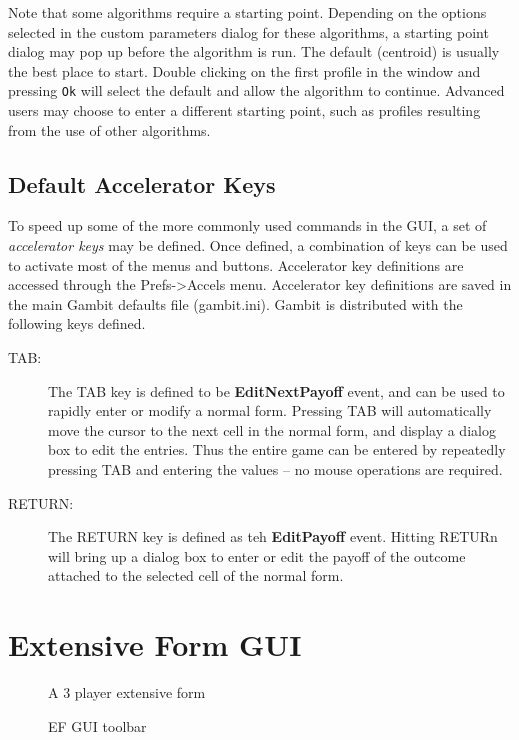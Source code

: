\documentclass[12pt]{report}
\begin{document}
Note that some algorithms require a starting point.  Depending on the
options selected in the custom parameters dialog for these algorithms,
a starting point dialog may pop up before the algorithm is run.  The
default (centroid) is usually the best place to start.  Double
clicking on the first profile in the window and pressing {\tt Ok} will
select the default and allow the algorithm to continue. Advanced users
may choose to enter a different starting point, such as profiles
resulting from the use of other algorithms.

\section{Default Accelerator Keys}\label{NormFormDefAccl}
To speed up some of the more commonly used commands in the GUI, a set of 
{\em accelerator keys} may be defined.  Once defined, a combination of keys
can be used to activate most of the menus and buttons.  Accelerator key
definitions are accessed through the Prefs->Accels menu.  Accelerator key
definitions are saved in the main Gambit defaults file (gambit.ini).  Gambit
is distributed with the following keys defined.
\begin{description}
\item[TAB:] The TAB key is defined to be {\bf EditNextPayoff} event, and 
can be used to rapidly enter or modify a normal form.  Pressing TAB
will automatically move the cursor to the next cell in the normal
form, and display a dialog box to edit the entries.  Thus the entire
game can be entered by repeatedly pressing TAB and entering the values
-- no mouse operations are required.
\item[RETURN:] The RETURN key is defined as teh {\bf EditPayoff}
event.  Hitting RETURn will bring up a dialog box to enter or edit the
payoff of the outcome attached to the selected cell of the normal
form.
\end{description}

\chapter{Extensive Form GUI}\label{EFGUI}

\begin{figure}
\caption{A 3 player extensive form}\label{fig_efg}
\end{figure}

\begin{figure}
\caption{EF GUI toolbar}\label{fig_efgtools}
\end{figure}
\end{document}
